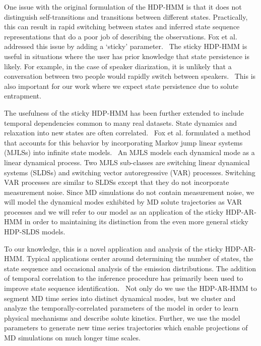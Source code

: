 \documentclass[journal=jpcbfk,manuscript=article]{achemso}
\begin{document}
  One issue with the original formulation of the HDP-HMM is that it does 
  not distinguish self-transitions and transitions between different states.
  Practically, this can result in rapid switching between states and inferred
  state sequence representations that do a poor job of describing the 
  observations. Fox et al. addressed this issue by adding a `sticky' 
  parameter.~\cite{fox_sticky_2007} The sticky HDP-HMM is useful in situations
  where the user has prior knowledge that state persistence is likely.
  For example, in the case of speaker diarization, it is unlikely that a 
  conversation between two people would rapidly switch between speakers.~\cite{fox_sticky_2011}
  This is also important for our work where we expect state persistence due
  to solute entrapment.   
  
  The usefulness of the sticky HDP-HMM has been further extended to include 
  temporal dependencies common to many real datasets. State dynamics and 
  relaxation into new states are often correlated.~\cite{calderon_data-driven_2014}
  Fox et al. formulated a method that accounts for this behavior by
  incorporating Markov jump linear systems (MJLSs) into infinite state 
  models.~\cite{fox_nonparametric_2009} An MJLS models each dynamical mode
  as a linear dynamical process. Two MJLS sub-classes are switching linear
  dynamical systems (SLDSs) and switching vector autoregressive (VAR) processes.
  Switching VAR processes are similar to SLDSs except that they do not
  incorporate measurement noise. Since MD simulations do not contain measurement
  noise, we will model the dynamical modes exhibited by MD solute trajectories 
  as VAR processes and we will refer to our model as an application of the 
  sticky HDP-AR-HMM in order to maintaining its distinction from the even more
  general sticky HDP-SLDS models.
  
  To our knowledge, this is a novel application and analysis of the sticky 
  HDP-AR-HMM. Typical applications center around determining the number of
  states, the state sequence and occasional analysis of the emission 
  distributions. The addition of temporal correlation to the inference 
  procedure has primarily been used to improve state sequence 
  identification.~\cite{calderon_inferring_2015,hamada_modeling_2016}
  Not only do we use the HDP-AR-HMM to segment MD time series into distinct
  dynamical modes, but we cluster and analyze the temporally-correlated 
  parameters of the model in order to learn physical mechanisms and describe
  solute kinetics. Further, we use the model parameters to generate new 
  time series trajectories which enable projections of MD simulations on 
  much longer time scales.
  
\end{document}
